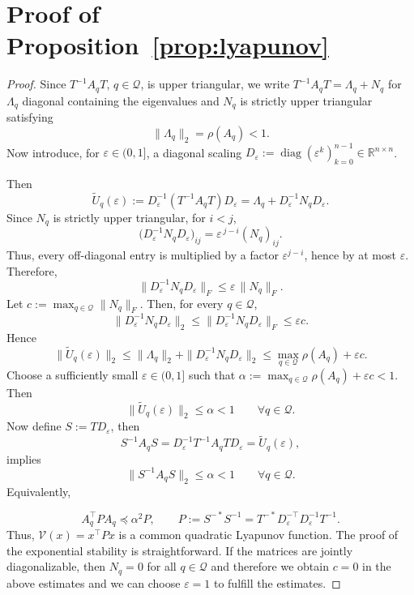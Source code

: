 \documentclass[11pt]{article}
\theoremstyle{plain}
\theoremstyle{definition}
\theoremstyle{remark}
\begin{document}
\appendix
\section{Proof of Proposition~\ref{prop:lyapunov}}
\label{sec:prop_lyapunov}
\begin{proof}
Since $T^{-1}A_qT$, $q\in\mathcal Q$, is upper triangular, we write $T^{-1}A_qT=\Lambda_q+N_q$ for $\Lambda_q$ diagonal containing the eigenvalues and
$N_q$ is strictly upper triangular satisfying
\[
\|\Lambda_q\|_2=\rho(A_q)<1.
\]
Now introduce, for $\varepsilon\in (0,1]$, a diagonal scaling
$D_\varepsilon:=\operatorname{diag}(\varepsilon^k)_{k=0}^{n-1}\in\mathbb{R}^{n\times n}$.

Then
\[
\widetilde U_q(\varepsilon):=D_\varepsilon^{-1}(T^{-1}A_qT)D_\varepsilon
=
\Lambda_q+D_\varepsilon^{-1}N_qD_\varepsilon.
\]
Since $N_q$ is strictly upper triangular, for $i<j$,
\[
\bigl(D_\varepsilon^{-1}N_qD_\varepsilon\bigr)_{ij}
=
\varepsilon^{\,j-i}(N_q)_{ij}.
\]
Thus, every off-diagonal entry is multiplied by a factor
$\varepsilon^{j-i}$, hence by at most $\varepsilon$.
Therefore,
\[
\|D_\varepsilon^{-1}N_qD_\varepsilon\|_F
\le \varepsilon\,\|N_q\|_F.
\]
Let
$c:=\max_{q\in\mathcal Q} \|N_q\|_F$. Then, for every $q\in\mathcal Q$,
\[
\|D_\varepsilon^{-1}N_qD_\varepsilon\|_2
\le
\|D_\varepsilon^{-1}N_qD_\varepsilon\|_F
\le \varepsilon c.
\]
Hence
\[
\|\widetilde U_q(\varepsilon)\|_2
\le
\|\Lambda_q\|_2+\|D_\varepsilon^{-1}N_qD_\varepsilon\|_2
\le \max_{q\in\mathcal Q}\rho(A_q)+\varepsilon c.
\]
Choose a sufficiently small $\varepsilon\in(0,1]$ such that
$\alpha:=\max_{q\in\mathcal Q}\rho(A_q)+\varepsilon c<1$. Then
\[
\|\widetilde U_q(\varepsilon)\|_2\le \alpha<1
\qquad\forall q\in\mathcal Q.
\]
Now define
$S:=TD_\varepsilon$, then
\[
S^{-1}A_qS
=
D_\varepsilon^{-1}T^{-1}A_qTD_\varepsilon
=
\widetilde U_q(\varepsilon),
\]
implies
\[
\|S^{-1}A_qS\|_2\le \alpha<1
\qquad\forall q\in\mathcal Q.
\]
Equivalently,

\[
A_q^\top P A_q \preceq \alpha^2 P,
\qquad
P:=S^{-*}S^{-1}
=
T^{-*}D_\varepsilon^{-\top}D_\varepsilon^{-1}T^{-1}.
\]
Thus, $\mathcal{V}(x)=x^\top Px$ is a common quadratic Lyapunov function. The proof of the exponential stability is straightforward. If the matrices are jointly diagonalizable, then $N_q=0$ for all $q\in\mathcal{Q}$ and therefore we obtain $c=0$ in the above estimates and we can choose $\varepsilon=1$ to fulfill the estimates.
\end{proof}
\end{document}
